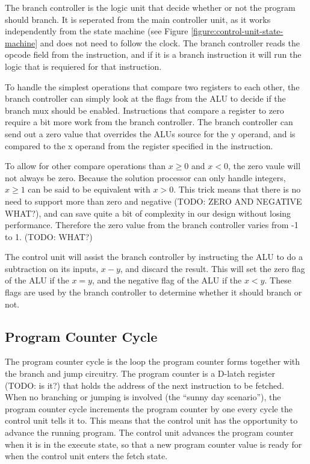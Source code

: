 The branch controller is the logic unit that decide whether or not the program should branch.
It is seperated from the main controller unit, as it works independently from the state machine (see Figure \ref{figure:control-unit-state-machine} and does not need to follow the clock.
The branch controller reads the opcode field from the instruction, and if it is a branch instruction it will run the logic that is requiered for that instruction.

To handle the simplest operations that compare two registers to each other, the branch controller can simply look at the flags from the ALU to decide if the branch mux should be enabled.
Instructions that compare a register to zero require a bit more work from the branch controller.
The branch controller can send out a zero value that overrides the ALUs source for the y operand, and is compared to the x operand from the register specified in the instruction.

To allow for other compare operations than $x \geq 0$ and $x < 0$, the zero vaule will not always be zero. 
Because the solution processor can only handle integers, $x \geq 1$ can be said to be equivalent with $x > 0$.
This trick means that there is no need to support more than zero and negative (TODO: ZERO AND NEGATIVE WHAT?), and can save quite a bit of complexity in our design without losing performance.
Therefore the zero value from the branch controller varies from -1 to 1. (TODO: WHAT?)

The control unit will assist the branch controller by instructing the ALU to do a subtraction on its inputs, $x - y$, and discard the result.
This will set the zero flag of the ALU if the $x = y$, and the negative flag of the ALU if the $x < y$.
These flags are used by the branch controller to determine whether it should branch or not.

\subsection{Program Counter Cycle}

The program counter cycle is the loop the program counter forms together with the branch and jump circuitry.
The program counter is a D-latch register (TODO: is it?) that holds the address of the next instruction to be fetched.
When no branching or jumping is involved (the ``sunny day scenario''), the program counter cycle increments the program counter by one every cycle the control unit tells it to.
This means that the control unit has the opportunity to advance the running program.
The control unit advances the program counter when it is in the execute state, so that a new program counter value is ready for when the control unit enters the fetch state.

